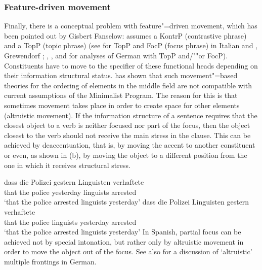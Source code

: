 \subsubsection{Feature-driven movement}
\label{sec-feature-driven-movement}

Finally, there is a conceptual problem with feature"=driven movement, which has been pointed out by Gisbert Fanselow:
\mbox{}\citet[]{Frey2004a} assumes a KontrP 
(contrastive phrase) and \citet{Frey2004b-u} a TopP (topic phrase) (see  for TopP and
FocP (focus phrase) in Italian and  
, Grewendorf \citeyearpar[, 240]{Grewendorf2002a}; \citeyear{Grewendorf2009a},
,  and  for analyses of German with TopP and/""or FocP). 
Constituents have to move to the specifier of these functional heads depending on their information structural status. \citet{Fanselow2003b} has
shown that such movement"=based theories for the ordering of elements in the middle field are not compatible with current assumptions of the 
Minimalist Program\indexmp. The reason for this is that sometimes movement takes place in order to create space for other elements (altruistic 
movement).
If the information structure of a sentence requires that the closest object to a verb is neither
focused nor part of the focus, then the object closest to the verb should not
receive the main stress in the clause. This can be achieved by deaccentuation, that is, by moving
the accent to another constituent or even, as shown in (b), by moving the object to a different position from the one in which it receives structural stress.

\eal
\ex 
\gll dass die Polizei gestern Linguisten verhaftete\\
	 that the police yesterday linguists arrested\\
\glt `that the police arrested linguists yesterday'
\ex 
\gll dass die Polizei Linguisten gestern verhaftete\\
	 that the police linguists yesterday arrested\\
\glt `that the police arrested linguists yesterday'
\zl
%
In Spanish, partial focus can be achieved not by special intonation, but rather only by altruistic movement in order to move the
object out of the focus. See also  for a discussion of `altruistic' multiple frontings in German.

